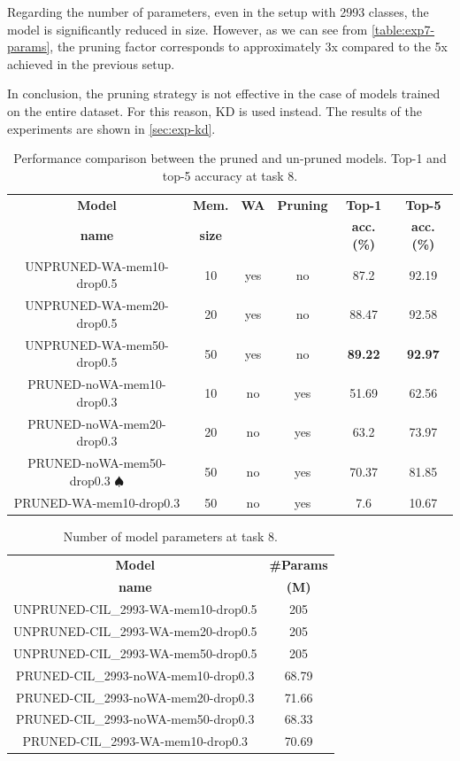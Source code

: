 Regarding the number of parameters, even in the setup with 2993 classes, the model is significantly reduced in size.
However, as we can see from \autoref{table:exp7-params}, the pruning factor corresponds to approximately 3x compared to the 5x achieved in the previous setup.

In conclusion, the pruning strategy is not effective in the case of models trained on the entire dataset.
For this reason, KD is used instead. The results of the experiments are shown in \autoref{sec:exp-kd}.

\begin{table}[H]
    \centering
    \begin{tabular}{c|c|c|c|c|c}
        \hline
        \textbf{Model} &
        \textbf{Mem.} &
        \textbf{WA} &
        \textbf{Pruning} &
        \textbf{Top-1} & 
        \textbf{Top-5} \\
        \textbf{name} &
        \textbf{size} &
        &
        &
        \textbf{acc. (\%)} & 
        \textbf{acc. (\%)} \\
        \hline
        \hline
UNPRUNED-WA-mem10-drop0.5&10&yes&no&87.2&92.19\\
UNPRUNED-WA-mem20-drop0.5&20&yes&no&88.47&92.58\\
UNPRUNED-WA-mem50-drop0.5&50&yes&no&\textbf{89.22}&\textbf{92.97}\\
\hline
PRUNED-noWA-mem10-drop0.3&10&no&yes&51.69&62.56\\
PRUNED-noWA-mem20-drop0.3&20&no&yes&63.2&73.97\\
PRUNED-noWA-mem50-drop0.3 $\spadesuit$&50&no&yes&70.37&81.85\\
\hline
PRUNED-WA-mem10-drop0.3&50&no&yes&7.6&10.67\\
\hline
\end{tabular}
\caption{Performance comparison between the pruned and un-pruned models. Top-1 and top-5 accuracy at task 8.}
    \label{table:exp7}
\end{table}


\begin{table}[H]
    \centering
    \begin{tabular}{c|c}
        \hline
        \textbf{Model} &
        \textbf{\#Params} \\
        \textbf{name} &
        \textbf{(M)} \\
        \hline
        \hline
UNPRUNED-CIL\_2993-WA-mem10-drop0.5&205\\
UNPRUNED-CIL\_2993-WA-mem20-drop0.5&205\\
UNPRUNED-CIL\_2993-WA-mem50-drop0.5&205\\
\hline
PRUNED-CIL\_2993-noWA-mem10-drop0.3&68.79\\
PRUNED-CIL\_2993-noWA-mem20-drop0.3&71.66\\
PRUNED-CIL\_2993-noWA-mem50-drop0.3&68.33\\
\hline
PRUNED-CIL\_2993-WA-mem10-drop0.3&70.69\\
        \hline
    \end{tabular}
	\caption{Number of model parameters at task 8.}%
    \label{table:exp7-params}
\end{table}

